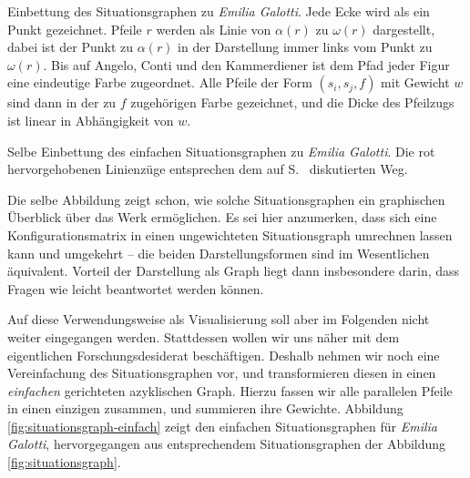 \documentclass[a4paper,10pt,abstract=true,headings=small]{scrartcl}
\begin{document}
\begin{SidewaysFigure}
    \centering
    \caption{Einbettung des Situationsgraphen zu \emph{Emilia Galotti}.
        Jede Ecke wird als ein Punkt gezeichnet. Pfeile $r$ werden als Linie von $\alpha(r)$ zu $\omega(r)$ dargestellt, dabei ist der Punkt zu $\alpha(r)$ in der Darstellung immer links vom Punkt zu $\omega(r)$.
    Bis auf Angelo, Conti und den Kammerdiener ist dem Pfad jeder Figur eine eindeutige Farbe zugeordnet. Alle Pfeile der Form $(s_i,s_j, f)$ mit Gewicht $w$ sind dann in der zu $f$ zugehörigen Farbe gezeichnet, und die Dicke des Pfeilzugs ist linear in Abhängigkeit von $w$.}
    \label{fig:situationsgraph}
    \caption{Selbe Einbettung des einfachen Situationsgraphen zu \emph{Emilia Galotti}. Die rot hervorgehobenen Linienzüge entsprechen dem auf S.~\pageref{pos:weg-diskussion} diskutierten Weg.} 
    \label{fig:situationsgraph-einfach}
\end{SidewaysFigure}

Die selbe Abbildung zeigt schon, wie solche Situationsgraphen ein graphischen Überblick über das Werk ermöglichen.
Es sei hier anzumerken, dass sich eine Konfigurationsmatrix in einen ungewichteten Situationsgraph umrechnen lassen kann und umgekehrt – die beiden Darstellungsformen sind im Wesentlichen äquivalent.
Vorteil der Darstellung als Graph liegt dann insbesondere darin, dass Fragen wie  leicht beantwortet werden können. %

Auf diese Verwendungsweise als Visualisierung soll aber im Folgenden nicht weiter eingegangen werden.
Stattdessen wollen wir uns näher mit dem eigentlichen Forschungsdesiderat beschäftigen.
Deshalb nehmen wir noch eine Vereinfachung des Situationsgraphen vor, und transformieren diesen in einen \emph{einfachen} gerichteten azyklischen Graph.
Hierzu fassen wir alle parallelen Pfeile in einen einzigen zusammen, und summieren ihre Gewichte.
Abbildung \ref{fig:situationsgraph-einfach} zeigt den einfachen Situationsgraphen für \emph{Emilia Galotti}, hervorgegangen aus entsprechendem Situationsgraphen der Abbildung \ref{fig:situationsgraph}.
\end{document}

